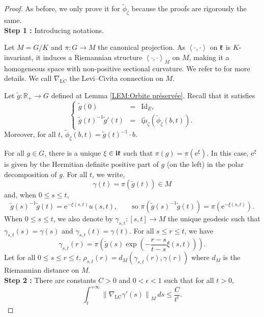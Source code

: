 \documentclass{article}
\theoremstyle{remark}
\theoremstyle{definition}
\newcommand{\R}{\mathbb{R}}
\newcommand{\Id}{\mathrm{Id}}
\newcommand{\LC}{\mathrm{LC}}
\renewcommand{\i}{\boldsymbol{\mathrm{i}}}
\newcommand{\e}{\boldsymbol{\mathrm{e}}}
\newcommand{\scal}[2]{\left< #1,#2 \right>}
\newcommand{\norme}[1]{\left\| #1 \right\|}
\renewcommand{\leq}{\leqslant}
\begin{document}
\begin{proof}
As before, we only prove it for $\tilde{\phi}_\zeta$ because the proofs are rigorously the same.\\

\noindent\textbf{Step 1 :} Introducing notations.

Let $M = G/K$ and $\pi : G \rightarrow M$ the canonical projection. As $\scal{\cdot}{\cdot}$ on $\frak{k}$ is $K$-invariant, it induces a Riemannian structure $\scal{\cdot}{\cdot}_M$ on $M$, making it a homogeneous space with non-positive sectional curvature. We refer to \cite[Appendix A, Appendix C]{GRS} for more details. We call $\nabla_\LC$ the Levi--Civita connection on $M$.

Let $\tilde{g} : \R_+ \rightarrow G$ defined at Lemma \ref{LEM:Orbite préservée}. Recall that it satisfies
$$
\left\{
    \begin{array}{rcl}
        \tilde{g}(0) & = & \Id_E,\\
        \tilde{g}(t)^{-1}\tilde{g}'(t) & = & \i\tilde{\mu}_\zeta(\tilde{\phi}_\zeta(b,t)).
    \end{array}
\right.
$$
Moreover, for all $t$, $\tilde{\phi}_\zeta(b,t) = \tilde{g}(t)^{-1} \cdot b$.

For all $g \in G$, there is a unique $\xi \in \i\frak{k}$ such that $\pi(g) = \pi(\e^\xi)$. In this case, $\e^\xi$ is given by the Hermitian definite positive part of $g$ (on the left) in the polar decomposition of $g$. For all $t$, we write,
$$
\gamma(t) = \pi(\tilde{g}(t)) \in M
$$
and, when $0 \leq s \leq t$,
\begin{equation}\label{EQ:Définition xi(s,t) et u(s,t)}
    \tilde{g}(s)^{-1}\tilde{g}(t) = \e^{-\xi(s,t)}u(s,t), \qquad \textrm{so } \pi(\tilde{g}(s)^{-1}\tilde{g}(t)) = \pi(\e^{-\xi(s,t)}).
\end{equation}
When $0 \leq s \leq t$, we also denote by $\gamma_{s,t} : [s,t] \rightarrow M$ the unique geodesic such that $\gamma_{s,t}(s) = \gamma(s)$ and $\gamma_{s,t}(t) = \gamma(t)$. For all $s \leq r \leq t$, we have
\begin{equation}\label{EQ:Expression gamma_st}
    \gamma_{s,t}(r) = \pi\left(\tilde{g}(s)\exp\left(-\frac{r - s}{t - s}\xi(s,t)\right)\right).
\end{equation}
Let for all $0 \leq s \leq r \leq t$, $\rho_{s,t}(r) = d_M(\gamma_{s,t}(r),\gamma(r))$ where $d_M$ is the Riemannian distance on $M$.\\

\noindent\textbf{Step 2 :} There are constants $C > 0$ and $0 < \epsilon < 1$ such that for all $t > 0$,
$$
\int_t^{+\infty} \norme{\nabla_\LC\gamma'(s)}_M \, ds \leq \frac{C}{t^\epsilon}.
$$


\end{proof}
\end{document}
